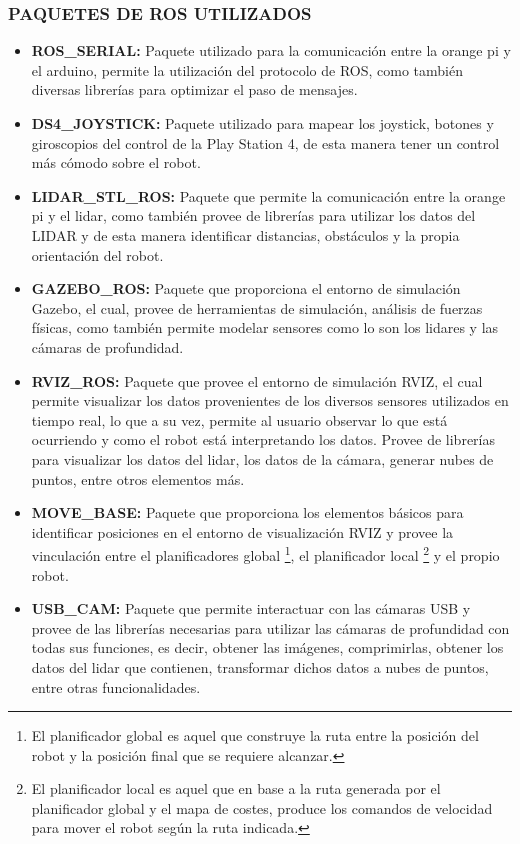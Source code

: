 \subsubsection{PAQUETES DE ROS UTILIZADOS}
\begin{itemize}
    \item \textbf{ROS\_SERIAL:} Paquete utilizado para la comunicación entre la orange pi y el arduino, permite la utilización del protocolo de ROS, como también diversas librerías para optimizar el paso de mensajes.
    \item \textbf{DS4\_JOYSTICK:} Paquete utilizado para mapear los joystick, botones y giroscopios del control de la Play Station 4, de esta manera tener un control más cómodo sobre el robot.
    \item \textbf{LIDAR\_STL\_ROS:} Paquete que permite la comunicación entre la orange pi y el lidar, como también provee de librerías para utilizar los datos del LIDAR y de esta manera identificar distancias, obstáculos y la propia orientación del robot.
    \item \textbf{GAZEBO\_ROS:} Paquete que proporciona el entorno de simulación Gazebo, el cual, provee de herramientas de simulación, análisis de fuerzas físicas, como también permite modelar sensores como lo son los lidares y las cámaras de profundidad.
    \item \textbf{RVIZ\_ROS:} Paquete que provee el entorno de simulación RVIZ, el cual permite visualizar los datos provenientes de los diversos sensores utilizados en tiempo real, lo que a su vez, permite al usuario observar lo que está ocurriendo y como el robot está interpretando los datos. Provee de librerías para visualizar los datos del lidar, los datos de la cámara, generar nubes de puntos, entre otros elementos más.
    \item \textbf{MOVE\_BASE:} Paquete que proporciona los elementos básicos para identificar posiciones en el entorno de visualización RVIZ y provee la vinculación entre el planificadores global \footnote{El planificador global es aquel que construye la ruta entre la posición del robot y la posición final que se requiere alcanzar.}, el planificador local \footnote{El planificador local es aquel que en base a la ruta generada por el planificador global y el mapa de costes, produce los comandos de velocidad para mover el robot según la ruta indicada.} y el propio robot.
    \item \textbf{USB\_CAM:} Paquete que permite interactuar con las cámaras USB y provee de las librerías necesarias para utilizar las cámaras de profundidad con todas sus funciones, es decir, obtener las imágenes, comprimirlas, obtener los datos del lidar que contienen, transformar dichos datos a nubes de puntos, entre otras funcionalidades.

\end{itemize}
